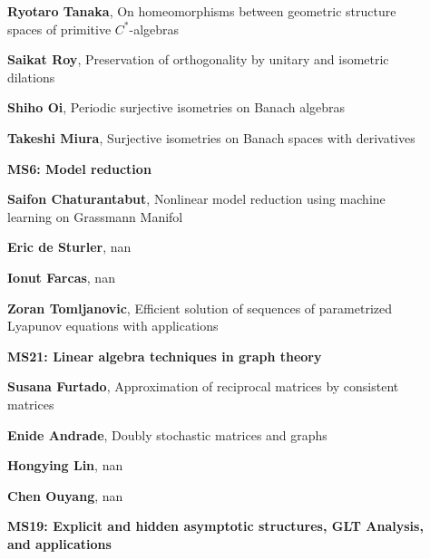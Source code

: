 \documentclass[ILAS2025-program.tex]{subfiles}
\begin{document}
\begin{description}
\begin{description}
    \item[] \textbf{Ryotaro Tanaka}, On homeomorphisms between geometric structure spaces of primitive $C^*$-algebras
        \item[] \textbf{Saikat Roy}, Preservation of orthogonality by unitary and isometric dilations
        \item[] \textbf{Shiho Oi}, Periodic surjective isometries on Banach algebras
        \item[] \textbf{Takeshi Miura}, Surjective isometries on Banach spaces with derivatives
        \end{description}
    \begin{description}
    \item[] {\color{mstitle}\textbf{MS6: Model reduction}} 
    \item[] \textbf{Saifon Chaturantabut}, Nonlinear model reduction using machine learning on Grassmann Manifol
        \item[] \textbf{Eric de Sturler}, nan
        \item[] \textbf{Ionut Farcas}, nan
        \item[] \textbf{Zoran Tomljanovic}, Efficient solution of sequences of parametrized Lyapunov equations with applications
        \end{description}
    \begin{description}
    \item[] {\color{mstitle}\textbf{MS21: Linear algebra techniques in graph theory}} 
    \item[] \textbf{Susana Furtado}, Approximation of reciprocal matrices by consistent matrices
        \item[] \textbf{Enide Andrade}, Doubly stochastic matrices and graphs
        \item[] \textbf{Hongying Lin}, nan
        \item[] \textbf{Chen Ouyang}, nan
        \end{description}
    \begin{description}
    \item[] {\color{mstitle}\textbf{MS19: Explicit and hidden asymptotic structures, GLT Analysis, and applications}} 

\end{description}
\end{description}
\end{document}
